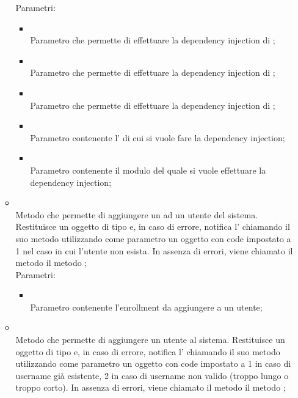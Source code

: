\begin{itemize}
\begin{itemize}
		Parametri:
		\begin{itemize}
			\item {} \\
			Parametro che permette di effettuare la dependency injection di ;
			\item {} \\
			Parametro che permette di effettuare la dependency injection di ;
			\item {} \\
			Parametro che permette di effettuare la dependency injection di ;
			\item {} \\
			Parametro contenente l' di cui si vuole fare la dependency injection;
			\item {} \\
			Parametro contenente il modulo  del quale si vuole effettuare la dependency injection;
		\end{itemize}
		\item[]  \\		Metodo che permette di aggiungere un  ad un utente del sistema. Restituisce un oggetto di tipo  e, in caso di errore, notifica l' chiamando il suo metodo  utilizzando come parametro un oggetto  con code impostato a 1 nel caso in cui l'utente non esista. In assenza di errori, viene chiamato il metodo il metodo ;\\
		Parametri:
		\begin{itemize}
			\item {} \\
			Parametro contenente l'enrollment da aggiungere a un utente;
		\end{itemize}
		\item[]  \\		Metodo che permette di aggiungere un utente al sistema. Restituisce un oggetto di tipo  e, in caso di errore, notifica l' chiamando il suo metodo  utilizzando come parametro un oggetto  con code impostato a 1 in caso di username già esistente, 2 in caso di username non valido (troppo lungo o troppo corto). In assenza di errori, viene chiamato il metodo il metodo ;\\

\end{itemize}
\end{itemize}
